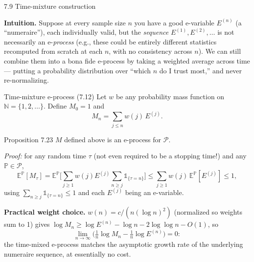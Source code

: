\documentclass[aspectratio=169,10pt]{beamer}
\newcommand{\Nmb}{\mathbb{N}}
\begin{document}
\begin{frame}[allowframebreaks]{7.9 Time-mixture construction}

\textbf{Intuition.} Suppose at every sample size $n$ you have a good e-variable $E^{(n)}$ (a ``numeraire''), each
individually valid, but the \emph{sequence} $E^{(1)}, E^{(2)}, \dots$ is not necessarily an e-\emph{process} (e.g.,
these could be entirely different statistics recomputed from scratch at each $n$, with no consistency across $n$).
We can still combine them into a bona fide e-process by taking a weighted average across time --- putting a
probability distribution over ``which $n$ do I trust most,'' and never re-normalizing.

\begin{block}{Time-mixture e-process (7.12)}
Let $w$ be any probability mass function on $\Nmb=\{1,2,\dots\}$. Define $M_0=1$ and
$$M_n = \sum_{j\le n} w(j)\, E^{(j)}.$$
\end{block}

\begin{block}{Proposition 7.23}
$M$ defined above is an e-process for $\mathcal P$.
\end{block}

\framebreak

\emph{Proof:} for any random time $\tau$ (not even required to be a stopping time!) and any $\mathbb P \in \mathcal
P$,
$$\mathbb E^{\mathbb P}[M_\tau] = \mathbb E^{\mathbb P}\Big[\sum_{j\ge1} w(j) E^{(j)} \sum_{n\ge j} \mathbb 1_{\{\tau=n\}}\Big]
\le \sum_{j\ge1} w(j)\,\mathbb E^{\mathbb P}[E^{(j)}] \le 1,$$
using $\sum_{n\ge j}\mathbb 1_{\{\tau=n\}} \le 1$ and each $E^{(j)}$ being an e-variable.

\textbf{Practical weight choice.} $w(n) = c/(n(\log n)^2)$ (normalized so weights sum to 1) gives
$\log M_n \ge \log E^{(n)} - \log n - 2\log\log n - O(1)$, so
$$\lim_{n\to\infty}\Big(\tfrac1n\log M_n - \tfrac1n\log E^{(n)}\Big) = 0:$$
the time-mixed e-process matches the asymptotic growth rate of the underlying numeraire sequence, at essentially no
cost.

\end{frame}
\end{document}
